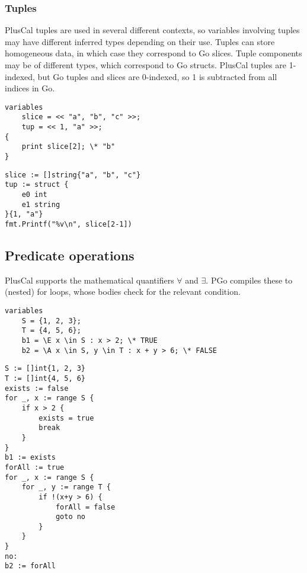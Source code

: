 \subsubsection{Tuples}
PlusCal tuples are used in several different contexts, so variables involving tuples may have different inferred types depending on their use. Tuples can store homogeneous data, in which case they correspond to Go slices. Tuple components may be of different types, which correspond to Go structs. PlusCal tuples are 1-indexed, but Go tuples and slices are 0-indexed, so 1 is subtracted from all indices in Go.

\noindent
\begin{minipage}[t]{0.45\textwidth}
\begin{lstlisting}[language=pcal]
variables
	slice = << "a", "b", "c" >>;
	tup = << 1, "a" >>;
{
	print slice[2]; \* "b"
}
\end{lstlisting}
\end{minipage}
\hfill
\begin{minipage}[t]{0.45\textwidth}
\begin{lstlisting}[language=golang]
slice := []string{"a", "b", "c"}
tup := struct {
	e0 int
	e1 string
}{1, "a"}
fmt.Printf("%v\n", slice[2-1])
\end{lstlisting}
\end{minipage}

\subsection{Predicate operations}
PlusCal supports the mathematical quantifiers $\forall$ and $\exists$. PGo compiles these to (nested) for loops, whose bodies check for the relevant condition.

\noindent
\begin{minipage}[t]{\textwidth}
\begin{lstlisting}[language=pcal]
variables
	S = {1, 2, 3};
	T = {4, 5, 6};
	b1 = \E x \in S : x > 2; \* TRUE
	b2 = \A x \in S, y \in T : x + y > 6; \* FALSE
\end{lstlisting}
\end{minipage}

\noindent
\begin{minipage}[t]{\textwidth}
\begin{lstlisting}[language=golang]
S := []int{1, 2, 3}
T := []int{4, 5, 6}
exists := false
for _, x := range S {
	if x > 2 {
		exists = true
		break
	}
}
b1 := exists
forAll := true
for _, x := range S {
	for _, y := range T {
		if !(x+y > 6) {
			forAll = false
			goto no
		}
	}
}
no:
b2 := forAll
\end{lstlisting}
\end{minipage}


